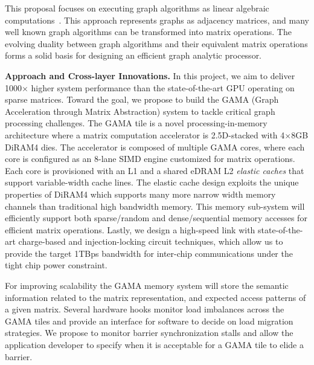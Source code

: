 \noindent
This proposal focuses on executing graph algorithms as linear algebraic computations~\cite{graph:primitives}. 
This approach represents graphs as adjacency matrices, and many well known graph algorithms can be transformed into matrix operations. 
The evolving 
duality between graph algorithms and their equivalent matrix operations forms a solid basis 
for designing an efficient graph analytic processor. 

\vspace{3pt}
\noindent
\textbf{Approach and Cross-layer Innovations.} 
In this project, we aim to deliver 1000$\times$ higher system performance than the state-of-the-art GPU operating on sparse matrices.
Toward the goal, we propose to build the GAMA (Graph Acceleration through Matrix Abstraction) system to tackle critical graph processing challenges. 
The GAMA tile is a novel processing-in-memory architecture where a matrix computation accelerator is 2.5D-stacked with 4$\times$8GB DiRAM4 dies.
The accelerator is composed of multiple GAMA cores, where each core is configured as an 8-lane SIMD engine customized for matrix operations. Each core 
is provisioned with an L1 and a shared eDRAM L2 \emph{elastic caches} that support variable-width cache lines.  
The elastic cache design exploits the unique properties of DiRAM4 which supports many more narrow width memory channels than traditional high bandwidth memory.
This memory sub-system will efficiently support both sparse/random and dense/sequential memory accesses for efficient matrix operations. 
Lastly, we  design a high-speed link with state-of-the-art charge-based and injection-locking circuit techniques, which allow us to provide the target 1TBps bandwidth for inter-chip communications under the tight chip power constraint.

For improving scalability the GAMA memory system will store the semantic information related to the matrix representation, and expected access patterns of a given matrix. Several hardware hooks monitor  load imbalances across the GAMA tiles and provide an interface for software to decide on load migration strategies. We propose to monitor barrier synchronization stalls and allow the application developer to specify when it is acceptable for a GAMA tile to elide a barrier. 

